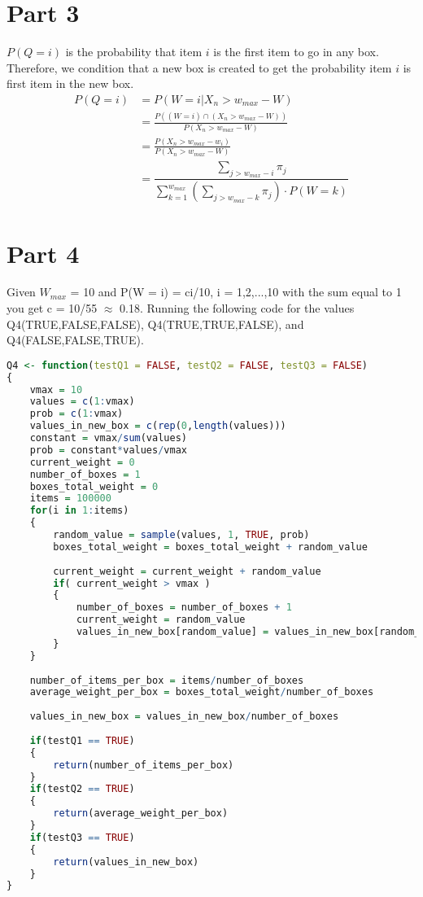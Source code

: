 \documentclass[10pt,a4paper]{article}
\begin{document}
\section{Part 3}
$P(Q=i)$ is the probability that item $i$ is the first item to go in any box. Therefore, we condition that a new box is created to get the probability item $i$ is first item in the new box.\\

\begin{align*}
P(Q=i) &= P(W=i | X_n > w_{max} - W) \\
&= \frac{P( ( W=i ) \cap (X_n > w_{max} - W))}{P(X_n > w_{max} - W)}\\
&= \frac{P(X_n > w_{max} -w_i)}{P(X_n > w_{max} - W)} \\
&= \dfrac{\sum\limits_{j > w_{max} - i} \pi_j }{\sum\limits_{k=1}^{w_{max}} \left(\sum\limits_{j > w_{max} -k} \pi_j \right) \cdot P(W=k)}
\end{align*}

\section{Part 4}
Given $W_{max}$ = 10 and P(W = i) = ci/10, i = 1,2,...,10 with the sum equal to 1 you get c = 10/55 $\approx$ 0.18. Running the following code for the values Q4(TRUE,FALSE,FALSE), Q4(TRUE,TRUE,FALSE), and Q4(FALSE,FALSE,TRUE).
 
\begin{lstlisting}[language = R]
Q4 <- function(testQ1 = FALSE, testQ2 = FALSE, testQ3 = FALSE)
{
    vmax = 10
    values = c(1:vmax)
    prob = c(1:vmax)
    values_in_new_box = c(rep(0,length(values)))
    constant = vmax/sum(values)
    prob = constant*values/vmax
    current_weight = 0
    number_of_boxes = 1
    boxes_total_weight = 0
    items = 100000
    for(i in 1:items)
    {
        random_value = sample(values, 1, TRUE, prob)
        boxes_total_weight = boxes_total_weight + random_value
       
        current_weight = current_weight + random_value
        if( current_weight > vmax )
        {
            number_of_boxes = number_of_boxes + 1
            current_weight = random_value
            values_in_new_box[random_value] = values_in_new_box[random_value] + 1
        }
    }
   
    number_of_items_per_box = items/number_of_boxes
    average_weight_per_box = boxes_total_weight/number_of_boxes
   
    values_in_new_box = values_in_new_box/number_of_boxes
   
    if(testQ1 == TRUE)
    {
        return(number_of_items_per_box)
    }
    if(testQ2 == TRUE)
    {
        return(average_weight_per_box)
    }
    if(testQ3 == TRUE)
    {
        return(values_in_new_box)
    }
}
 
\end{lstlisting}
 
\end{document}
